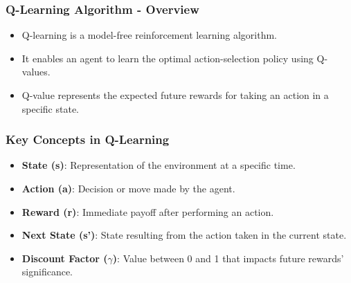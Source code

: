 \documentclass{beamer}
\begin{document}
\begin{frame}[fragile]
    \frametitle{Q-Learning Algorithm - Overview}
    \begin{itemize}
        \item Q-learning is a model-free reinforcement learning algorithm.
        \item It enables an agent to learn the optimal action-selection policy using Q-values.
        \item Q-value represents the expected future rewards for taking an action in a specific state.
    \end{itemize}
\end{frame}

\begin{frame}[fragile]
    \frametitle{Key Concepts in Q-Learning}
    \begin{itemize}
        \item \textbf{State (s)}: Representation of the environment at a specific time.
        \item \textbf{Action (a)}: Decision or move made by the agent.
        \item \textbf{Reward (r)}: Immediate payoff after performing an action.
        \item \textbf{Next State (s')}: State resulting from the action taken in the current state.
        \item \textbf{Discount Factor ($\gamma$)}: Value between 0 and 1 that impacts future rewards' significance.
    \end{itemize}
\end{frame}
\end{document}
